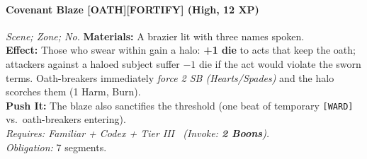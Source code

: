 \paragraph{Covenant Blaze \textnormal{[OATH][FORTIFY]} (High, 12 XP)} \emph{Scene; Zone; No.}
\textbf{Materials:} A brazier lit with three names spoken.\\
\textbf{Effect:} Those who swear within gain a halo: \textbf{+1 die} to acts that keep the oath; attackers against a haloed subject suffer \(-1\) die if the act would violate the sworn terms. Oath-breakers immediately \emph{force 2 SB (Hearts/Spades)} and the halo scorches them (1 Harm, Burn).\\
\textbf{Push It:} The blaze also sanctifies the threshold (one beat of temporary \texttt{[WARD]} vs.\ oath-breakers entering).\\
\emph{Requires: Familiar + Codex + Tier III \ (\textit{Invoke:} \textbf{2 Boons}).}\\
\emph{Obligation:} 7 segments.
